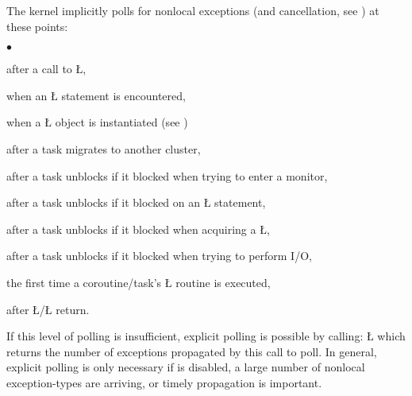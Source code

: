 \documentclass[openright,twoside]{report}
\begin{document}
The\label{p:ListPollingPoints} \uC kernel implicitly polls for nonlocal exceptions (and cancellation, see ) at these points:
\begin{list}{$\bullet$}{\topsep=3pt\parsep=0pt\itemsep=0pt}
\item after a call to \LGinlinetrue\LGbegin\lgrinde\L{}\endlgrinde\LGend{},
\item when an \LGinlinetrue\LGbegin\lgrinde\L{}\endlgrinde\LGend{} statement is encountered,
\item when a \LGinlinetrue\LGbegin\lgrinde\L{}\endlgrinde\LGend{} object is instantiated (see ) 
\item after a task migrates to another cluster,
\item after a task unblocks if it blocked when trying to enter a monitor,
\item after a task unblocks if it blocked on an \LGinlinetrue\LGbegin\lgrinde\L{}\endlgrinde\LGend{} statement,
\item after a task unblocks if it blocked when acquiring a \LGinlinetrue\LGbegin\lgrinde\L{}\endlgrinde\LGend{},
\item after a task unblocks if it blocked when trying to perform I/O,
\item the first time a coroutine/task's \LGinlinetrue\LGbegin\lgrinde\L{}\endlgrinde\LGend{} routine is executed,
\item after \LGinlinetrue\LGbegin\lgrinde\L{}\endlgrinde\LGend{}/\LGinlinetrue\LGbegin\lgrinde\L{}\endlgrinde\LGend{} return.
\end{list}
If this level of polling is insufficient, explicit polling is possible by calling:
\LGinlinefalse\LGbegin\lgrinde
\L{}
\endlgrinde\LGend
{}%
%
which returns the number of exceptions propagated by this call to poll.
In general, explicit polling is only necessary if  is disabled, a large number of nonlocal exception-types are arriving, or timely propagation is important.
\end{document}
